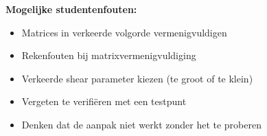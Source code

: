 \documentclass{ximera}
\begin{document}
\begin{freeResponse}
\textbf{Mogelijke studentenfouten:}
\begin{itemize}
\item Matrices in verkeerde volgorde vermenigvuldigen
\item Rekenfouten bij matrixvermenigvuldiging
\item Verkeerde shear parameter kiezen (te groot of te klein)
\item Vergeten te verifiëren met een testpunt
\item Denken dat de aanpak niet werkt zonder het te proberen
\end{itemize}
\end{freeResponse}
\end{document}
